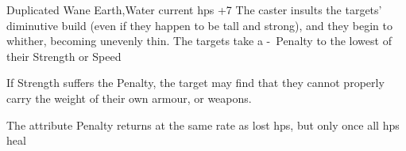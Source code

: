   {Duplicated}%
  {Wane}%
  {Earth,Water}%
  {current \glspl{hp} +7}%
  {The caster insults the targets' diminutive build (even if they happen to be tall and strong), and they begin to whither, becoming unevenly thin.
    The targets take a -~Penalty to the lowest of their Strength or Speed}%
  {If Strength suffers the Penalty, the target may find that they cannot properly carry the weight of their own armour, or weapons.

    The \gls{attribute} Penalty returns at the same rate as lost \glspl{hp}, but only once all \glspl{hp} heal}

